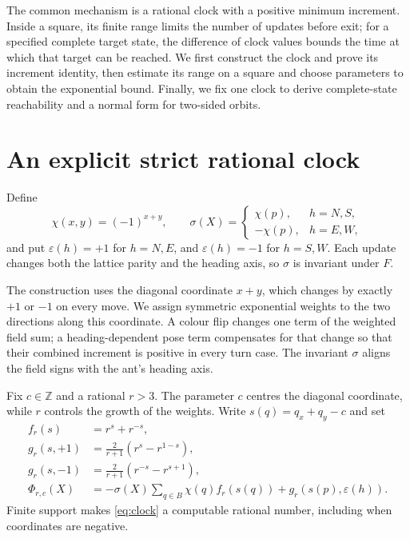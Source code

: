 \documentclass[11pt,a4paper]{article}
\theoremstyle{remark}\newtheorem{remark}[theorem]{Remark}
\newcommand{\Z}{\mathbb Z}\newcommand{\N}{\mathbb N}\newcommand{\Q}{\mathbb Q}
\newcommand{\eps}{\varepsilon}\newcommand{\symdiff}{\mathbin{\triangle}}
\begin{document}
The common mechanism is a rational clock with a positive minimum increment.
Inside a square, its finite range limits the number of updates before exit;
for a specified complete target state, the difference of clock values bounds
the time at which that target can be reached. We first construct the clock
and prove its increment identity, then estimate its range on a square and
choose parameters to obtain the exponential bound. Finally, we fix one clock
to derive complete-state reachability and a normal form for two-sided orbits.

\section{An explicit strict rational clock}
Define
\[
 \chi(x,y)=(-1)^{x+y},\qquad
 \sigma(X)=\begin{cases}\chi(p),&h=N,S,\\-\chi(p),&h=E,W,\end{cases}
\]
and put $\eps(h)=+1$ for $h=N,E$, and $\eps(h)=-1$ for $h=S,W$.
Each update changes both the lattice parity and the heading axis, so $\sigma$
is invariant under $F$.

The construction uses the diagonal coordinate $x+y$, which changes by
exactly $+1$ or $-1$ on every move. We assign symmetric exponential weights
to the two directions along this coordinate. A colour flip changes one term
of the weighted field sum; a heading-dependent pose term compensates for that
change so that their combined increment is positive in every turn case.
The invariant $\sigma$ aligns the field signs with the ant's heading axis.

Fix $c\in\Z$ and a rational $r>3$. The parameter $c$ centres the diagonal
coordinate, while $r$ controls the growth of the weights. Write
$s(q)=q_x+q_y-c$ and set
\begin{align}
 f_r(s)&=r^s+r^{-s},\\
 g_r(s,+1)&=\frac{2}{r+1}(r^s-r^{1-s}),\\
 g_r(s,-1)&=\frac{2}{r+1}(r^{-s}-r^{s+1}),\\
 \Phi_{r,c}(X)&=-\sigma(X)\sum_{q\in B}\chi(q)f_r(s(q))
                    +g_r(s(p),\eps(h)).\label{eq:clock}
\end{align}
Finite support makes \eqref{eq:clock} a computable rational number, including
when coordinates are negative.
\end{document}
